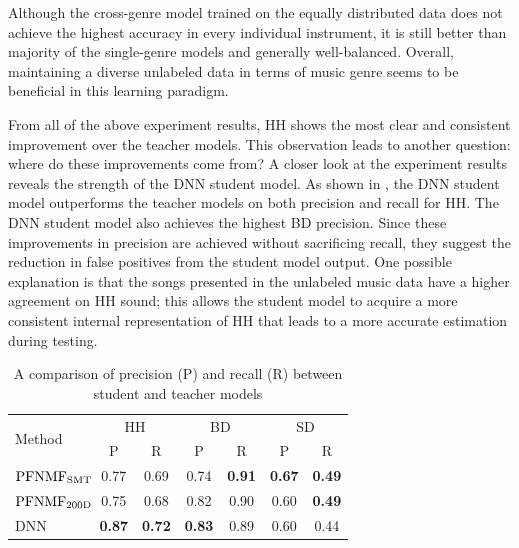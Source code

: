 \documentclass{article}
\begin{document}
Although the cross-genre model trained on the equally distributed data does not achieve the highest accuracy in every individual instrument, it is still better than majority of the single-genre models and generally well-balanced. Overall, maintaining a diverse unlabeled data in terms of music genre seems to be beneficial in this learning paradigm. %
%


From all of the above experiment results, HH shows the most clear and consistent improvement over the teacher models. This observation leads to another question: where do these improvements come from? A closer look at the experiment results reveals the strength of the DNN student model. As shown in , the DNN student model outperforms the teacher models on both precision and recall for HH. The DNN student model also achieves the highest BD precision. Since these improvements in precision are achieved without sacrificing recall, they suggest the reduction in false positives from the student model output. One possible explanation is that the songs presented in the unlabeled music data have a higher agreement on HH sound; this allows the student model to acquire a more consistent internal representation of HH that leads to a more accurate estimation during testing. %

\begin{table}
\centering
\begin{tabular}{l|cccccc}
\hline
\multirow{2}{*}{Method} & \multicolumn{2}{c}{HH}          & \multicolumn{2}{c}{BD}          & \multicolumn{2}{c}{SD}          \\ \cline{2-7} 
                        & P              & R              & P              & R              & P              & R              \\ \hline
$\text{PFNMF}_\mathrm{SMT}\hspace{-2mm}$             & 0.77          & 0.69          & 0.74          & \textbf{0.91} & \textbf{0.67} & \textbf{0.49} \\
$\text{PFNMF}_\mathrm{200D}\hspace{-2mm}$            & 0.75          & 0.68          & 0.82          & 0.90          & 0.60          & \textbf{0.49}          \\
DNN                     & \textbf{0.87} & \textbf{0.72} & \textbf{0.83} & 0.89          & 0.60          & 0.44          \\ \hline
\end{tabular}
\caption{A comparison of precision (P) and recall (R) between student and teacher models}
\label{tab:pr_comp}
\end{table}
\end{document}
